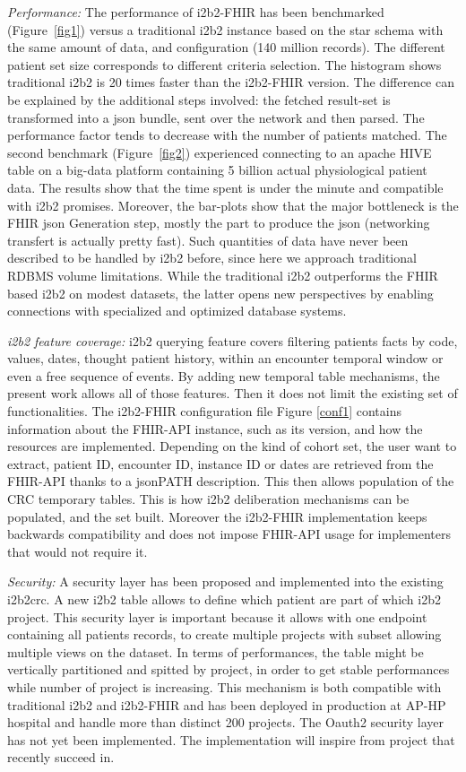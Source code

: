 \documentclass{amia}
\begin{document}
\textit{Performance:} The performance of i2b2-FHIR has been benchmarked (Figure~\ref{fig1}) versus a traditional i2b2 instance based on the star schema with the same amount of data, and configuration (140 million records). The different patient set size corresponds to different criteria selection. The histogram shows traditional i2b2 is 20 times faster than the i2b2-FHIR version. The difference can be explained by the additional steps involved: the fetched result-set is transformed into a json bundle, sent over the network and then parsed. The performance factor tends to decrease with the number of patients matched. The second benchmark (Figure~\ref{fig2}) experienced connecting to an apache HIVE table on a big-data platform containing 5 billion actual physiological patient data. The results show that the time spent is under the minute and compatible with i2b2 promises. Moreover, the bar-plots show that the major bottleneck is the FHIR json Generation step, mostly the part to produce the json (networking transfert is actually pretty fast). Such quantities of data have never been described to be handled by i2b2 before, since here we approach traditional RDBMS volume limitations. While the traditional i2b2 outperforms the FHIR based i2b2 on modest datasets, the latter opens new perspectives by enabling connections with specialized and optimized database systems.


\textit{i2b2 feature coverage: }i2b2 querying feature covers filtering patients facts by code, values, dates, thought patient history, within an encounter temporal window or even a free sequence of events. By adding new temporal table mechanisms, the present work allows all of those features. Then it does not limit the existing set of functionalities. The i2b2-FHIR configuration file Figure \ref{conf1} contains information about the FHIR-API instance, such as its version, and how the resources are implemented. Depending on the kind of cohort set, the user want to extract, patient ID, encounter ID, instance ID or dates are retrieved from the FHIR-API thanks to a jsonPATH description. This then allows population of the CRC temporary tables. This is how i2b2 deliberation mechanisms can be populated, and the set built. Moreover the i2b2-FHIR implementation keeps backwards compatibility and does not impose FHIR-API usage for implementers that would not require it.

\textit{Security:} A security layer has been proposed and implemented into the existing i2b2crc. A new i2b2 table allows to define which patient are part of which i2b2 project. This security layer is important because it allows with one endpoint containing all patients records, to create multiple projects with subset allowing multiple views on the dataset. In terms of performances, the table might be vertically partitioned and spitted by project, in order to get stable performances while number of project is increasing. This mechanism is both compatible with traditional i2b2 and i2b2-FHIR and has been deployed in production at AP-HP hospital and handle more than distinct 200 projects. The Oauth2 security layer has not yet been implemented. The implementation will inspire from project\cite{Wagholikar_2016,Pfiffner__2016} that recently succeed in.
\end{document}
